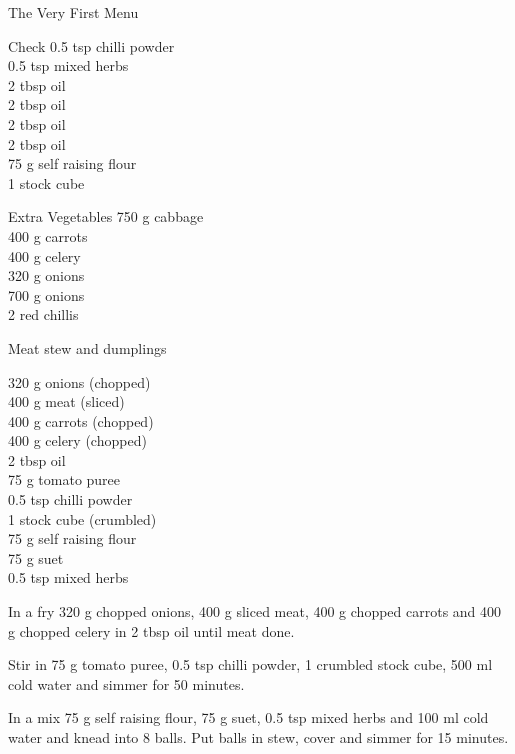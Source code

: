 \begin{menu}{The Very First Menu}
\begin{shoppinglist}{Check}
      0.5 tsp chilli powder \\ 
      0.5 tsp mixed herbs \\ 
      2 tbsp oil \\ 
      2 tbsp oil \\ 
      2 tbsp oil \\ 
      2 tbsp oil \\ 
      75 g self raising flour \\ 
      1  stock cube \\ 
      \end{shoppinglist}%
      \begin{shoppinglist}{Extra Vegetables}
      750 g cabbage \\ 
      400 g carrots \\ 
      400 g celery \\ 
      320 g onions \\ 
      700 g onions \\ 
      2  red chillis \\ 
      \end{shoppinglist}%
      \par %
    \hfil%
    \clearpage
  
    \begin{recipe}{2}{Meat stew and dumplings}%
    
		\begin{ingredients}
		320 g onions (chopped) \\
	400 g meat (sliced) \\
	400 g carrots (chopped) \\
	400 g celery (chopped) \\
	2 tbsp oil  \\
	75 g tomato puree  \\
	0.5 tsp chilli powder  \\
	1  stock cube (crumbled) \\
	75 g self raising flour  \\
	75 g suet  \\
	0.5 tsp mixed herbs  \\
	
		\end{ingredients}
	
    \begin{instructions}
    \item \item 
				In a  fry
				320 g chopped onions,
				400 g sliced meat,
				400 g chopped carrots
				and
				400 g chopped celery
				in
				2 tbsp  oil
				until meat done.
			\item 
				Stir in
				75 g  tomato puree,
				0.5 tsp  chilli powder,
				1  crumbled stock cube,
				500 ml  cold water
				and simmer for 50 minutes.
			\item 
				In a  mix
				75 g  self raising flour,
				75 g  suet,
				0.5 tsp  mixed herbs
				and
				100 ml  cold water
				and knead into 8 balls.
				Put balls in stew, cover and
				simmer for 15 minutes.
			

\end{instructions}
\end{recipe}
\end{menu}

